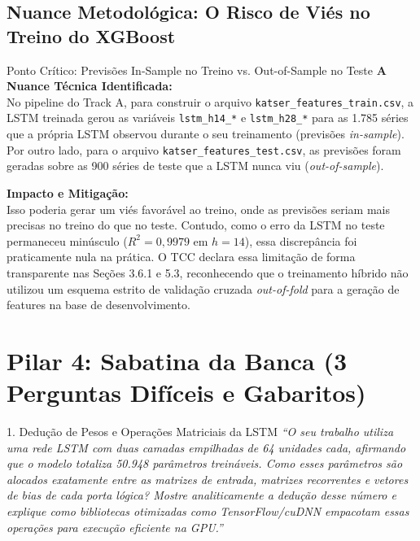 \documentclass[11pt,a4paper]{article}
\begin{document}
\subsection{Nuance Metodológica: O Risco de Viés no Treino do XGBoost}
\begin{decisionBox}{Ponto Crítico: Previsões In-Sample no Treino vs. Out-of-Sample no Teste}
\textbf{A Nuance Técnica Identificada:}\\
No pipeline do Track A, para construir o arquivo \texttt{katser\_features\_train.csv}, a LSTM treinada gerou as variáveis \texttt{lstm\_h14\_*} e \texttt{lstm\_h28\_*} para as 1.785 séries que a própria LSTM observou durante o seu treinamento (previsões \textit{in-sample}). Por outro lado, para o arquivo \texttt{katser\_features\_test.csv}, as previsões foram geradas sobre as 900 séries de teste que a LSTM nunca viu (\textit{out-of-sample}).

\textbf{Impacto e Mitigação:}\\
Isso poderia gerar um viés favorável ao treino, onde as previsões seriam mais precisas no treino do que no teste. Contudo, como o erro da LSTM no teste permaneceu minúsculo ($R^2 = 0{,}9979$ em $h=14$), essa discrepância foi praticamente nula na prática. O TCC declara essa limitação de forma transparente nas Seções 3.6.1 e 5.3, reconhecendo que o treinamento híbrido não utilizou um esquema estrito de validação cruzada \textit{out-of-fold} para a geração de features na base de desenvolvimento.
\end{decisionBox}

\vspace{0.4cm}
\section{Pilar 4: Sabatina da Banca (3 Perguntas Difíceis e Gabaritos)}

\begin{boardQuestion}{1. Dedução de Pesos e Operações Matriciais da LSTM}
\textit{“O seu trabalho utiliza uma rede LSTM com duas camadas empilhadas de 64 unidades cada, afirmando que o modelo totaliza 50.948 parâmetros treináveis. Como esses parâmetros são alocados exatamente entre as matrizes de entrada, matrizes recorrentes e vetores de bias de cada porta lógica? Mostre analiticamente a dedução desse número e explique como bibliotecas otimizadas como TensorFlow/cuDNN empacotam essas operações para execução eficiente na GPU.”}
\end{boardQuestion}
\end{document}
